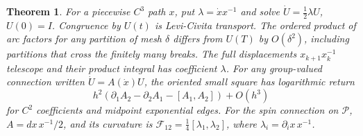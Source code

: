 \documentclass[11pt,reqno]{amsart}
\newtheorem{theorem}{Theorem}[section]
\theoremstyle{definition}
\theoremstyle{remark}
\numberwithin{equation}{section}
\begin{document}
\begin{theorem}\label{m3:product}
For a piecewise \(C^3\) path \(x\), put
\(\lambda=\dot x x^{-1}\) and solve \(\dot U=\tfrac12\lambda U\),
\(U(0)=I\). Congruence by \(U(t)\) is Levi-Civita transport.
The ordered product of arc factors for any partition of mesh
\(\delta\) differs from \(U(T)\) by \(O(\delta^2)\), including
partitions that cross the finitely many breaks.
The full displacements \(x_{k+1}x_k^{-1}\) telescope and their
product integral has coefficient \(\lambda\).
For any group-valued connection written \(\dot U=A(\dot x)U\),
the oriented small square has logarithmic return
\[
 h^2(\partial_1 A_2-\partial_2 A_1-[A_1,A_2])+O(h^3)
\]
for \(C^2\) coefficients and midpoint exponential edges.
For the spin connection on \(\mathcal P\),
\(A=dx\,x^{-1}/2\), and its curvature is
\(\mathcal F_{12}=\tfrac14[\lambda_1,\lambda_2]\),
where \(\lambda_i=\partial_i x\,x^{-1}\).
\end{theorem}
\end{document}
